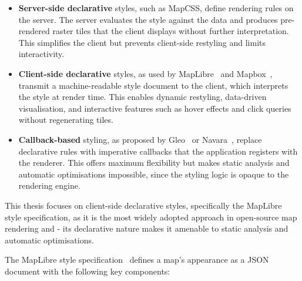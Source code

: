 \begin{itemize}
    \item \textbf{Server-side declarative} styles, such as MapCSS, define rendering rules on the server.
    The server evaluates the style against the data and produces pre-rendered raster tiles that the client displays without further interpretation.
    This simplifies the client but prevents client-side restyling and limits interactivity.

    \item \begin{sloppypar}\textbf{Client-side declarative} styles, as used by MapLibre~\cite{maplibreMapLibre} and Mapbox~\cite{MapboxMapsNavigation}, transmit a machine-readable style document to the client, which interprets the style at render time.
    This enables dynamic restyling, data-driven visualisation, and interactive features such as hover effects and click queries without regenerating tiles.\end{sloppypar}

    \item \textbf{Callback-based} styling, as proposed by Gleo~\cite{ortegaGleoWebGLMap} or Navara~\cite{Navara}, replace declarative rules with imperative callbacks that the application registers with the renderer.
    This offers maximum flexibility but makes static analysis and automatic optimisations impossible, since the styling logic is opaque to the rendering engine.
\end{itemize}

This thesis focuses on client-side declarative styles, specifically the MapLibre style specification, as it is the most widely adopted approach in open-source map rendering and - its declarative nature makes it amenable to static analysis and automatic optimisations.

The MapLibre style specification~\cite{MapLibreStyleSpec} defines a map's appearance as a JSON document with the following key components:

